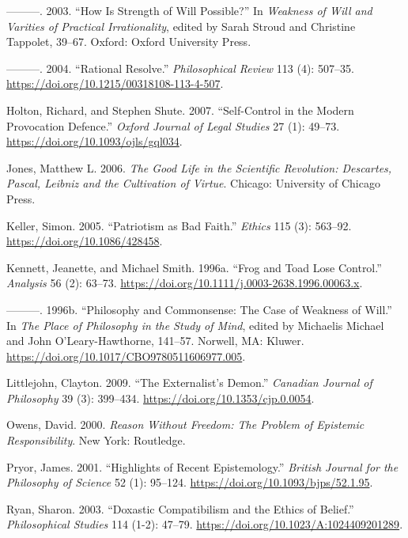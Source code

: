 \documentclass[
  11pt,
  letterpaper,
  DIV=11,
  numbers=noendperiod,
  oneside]{scrartcl}
\newlength{\cslhangindent}
\newenvironment{CSLReferences}[2] %
 {\begin{list}{}{%
  \setlength{\itemindent}{0pt}
  \setlength{\leftmargin}{0pt}
  \setlength{\parsep}{0pt}
  \ifodd #1
   \setlength{\leftmargin}{\cslhangindent}
   \setlength{\itemindent}{-1\cslhangindent}
  \fi
  \setlength{\itemsep}{#2\baselineskip}}}
 {\end{list}}
\begin{document}
\begin{CSLReferences}{1}{0}
---------. 2003. {``How Is Strength of Will Possible?''} In
\emph{Weakness of Will and Varities of Practical Irrationality}, edited
by Sarah Stroud and Christine Tappolet, 39--67. Oxford: Oxford
University Press.

---------. 2004. {``Rational Resolve.''} \emph{Philosophical Review} 113
(4): 507--35. \url{https://doi.org/10.1215/00318108-113-4-507}.

Holton, Richard, and Stephen Shute. 2007. {``Self-Control in the Modern
Provocation Defence.''} \emph{Oxford Journal of Legal Studies} 27 (1):
49--73. \url{https://doi.org/10.1093/ojls/gql034}.

Jones, Matthew L. 2006. \emph{The Good Life in the Scientific
Revolution: Descartes, Pascal, Leibniz and the Cultivation of Virtue}.
Chicago: University of Chicago Press.

Keller, Simon. 2005. {``Patriotism as Bad Faith.''} \emph{Ethics} 115
(3): 563--92. \url{https://doi.org/10.1086/428458}.

Kennett, Jeanette, and Michael Smith. 1996a. {``Frog and Toad Lose
Control.''} \emph{Analysis} 56 (2): 63--73.
\url{https://doi.org/10.1111/j.0003-2638.1996.00063.x}.

---------. 1996b. {``Philosophy and Commonsense: The Case of Weakness of
Will.''} In \emph{The Place of Philosophy in the Study of Mind}, edited
by Michaelis Michael and John O'Leary-Hawthorne, 141--57. Norwell, MA:
Kluwer. \url{https://doi.org/10.1017/CBO9780511606977.005}.

Littlejohn, Clayton. 2009. {``The Externalist's Demon.''} \emph{Canadian
Journal of Philosophy} 39 (3): 399--434.
\url{https://doi.org/10.1353/cjp.0.0054}.

Owens, David. 2000. \emph{Reason Without Freedom: The Problem of
Epistemic Responsibility}. New York: Routledge.

Pryor, James. 2001. {``Highlights of Recent Epistemology.''}
\emph{British Journal for the Philosophy of Science} 52 (1): 95--124.
\url{https://doi.org/10.1093/bjps/52.1.95}.

Ryan, Sharon. 2003. {``Doxastic Compatibilism and the Ethics of
Belief.''} \emph{Philosophical Studies} 114 (1-2): 47--79.
\url{https://doi.org/10.1023/A:1024409201289}.


\end{CSLReferences}
\end{document}
